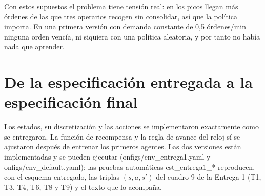\documentclass[11pt,letterpaper]{article}
\makeatletter
\newcommand{\code}[1]{{\ttfamily\codebreaks#1\endcodebreaks}}
\def\codebreaks#1\endcodebreaks{\@codebreaks#1\@nil}
\def\@codebreaks#1{\ifx#1\@nil\else\ifx#1/\slash\else\ifx#1\_\_\allowbreak\else#1\fi\fi\expandafter\@codebreaks\fi}
\makeatother
\begin{document}
Con estos supuestos el problema tiene tensión real: en los picos llegan más órdenes de las que tres
operarios recogen sin consolidar, así que la política importa. En una primera versión con demanda
constante de 0,5 órdenes/min ninguna orden vencía, ni siquiera con una política aleatoria, y por tanto no
había nada que aprender.

\section{De la especificación entregada a la especificación final}
\label{sec:cambios}

Los estados, su discretización y las acciones se implementaron exactamente como se entregaron. La
función de recompensa y la regla de avance del reloj sí se ajustaron después de entrenar los primeros
agentes. Las dos versiones están implementadas y se pueden ejecutar
(\code{configs/env\_entrega1.yaml} y \code{configs/env\_default.yaml}); las pruebas automáticas
\code{test\_entrega1\_*} reproducen, con el esquema entregado, las triplas $(s,a,s')$ del cuadro 9 de la
Entrega 1 (T1, T3, T4, T6, T8 y T9) y el texto que lo acompaña.
\end{document}
